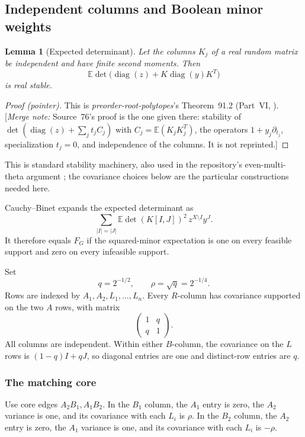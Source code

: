 \documentclass[11pt,a4paper]{article}
\newtheorem{lemma}[theorem]{Lemma}
\theoremstyle{remark}\newtheorem{remark}[theorem]{Remark}
\newcommand{\EE}{\mathbb E}                %
\newcommand{\diag}{\operatorname{diag}}    %
\newcommand{\mnote}[1]{[\textit{Merge note:} #1]}
\newcommand{\prp}{\emph{preorder-root-polytopes}}
\begin{document}
\subsection{Independent columns and Boolean minor weights}
\begin{lemma}[Expected determinant]\label{mrn:w:sb:lem:expected}
Let the columns $K_j$ of a real random matrix be independent and have finite second moments. Then
\[
 \EE\det\big(\diag(z)+K\diag(y)K^T\big)
\]
is real stable.
\end{lemma}
\begin{proof}[Proof (pointer)]
This is \prp's Theorem~91.2 (Part~VI, ). \mnote{Source~76's proof is the one given there: stability of $\det(\diag(z)+\sum_jt_jC_j)$ with $C_j=\EE(K_jK_j^T)$, the operators $1+y_j\partial_{t_j}$, specialization $t_j=0$, and independence of the columns. It is not reprinted.}
\end{proof}
This is standard stability machinery, also used in the repository's even-multi-theta argument \cite{b:PRP}; the covariance choices below are the particular constructions needed here.

Cauchy--Binet expands the expected determinant as
\begin{equation}\label{mrn:w:sb:eq:minors}
 \sum_{|I|=|J|}\EE\det(K[I,J])^2\,z^{X\setminus I}y^J.
\end{equation}
It therefore equals $F_G$ if the squared-minor expectation is one on every feasible support and zero on every infeasible support.

Set
\[
 q=2^{-1/2},\qquad \rho=\sqrt q=2^{-1/4}.
\]
Rows are indexed by $A_1,A_2,L_1,\ldots,L_n$. Every $R$-column has covariance supported on the two $A$ rows, with matrix
\begin{equation}\label{mrn:w:sb:eq:Rcov}
 \begin{pmatrix}1&q\\q&1\end{pmatrix}.
\end{equation}
All columns are independent. Within either $B$-column, the covariance on the $L$ rows is $(1-q)I+qJ$, so diagonal entries are one and distinct-row entries are $q$.

\subsubsection{The matching core}
Use core edges $A_2B_1,A_1B_2$. In the $B_1$ column, the $A_1$ entry is zero, the $A_2$ variance is one, and its covariance with each $L_i$ is $\rho$. In the $B_2$ column, the $A_2$ entry is zero, the $A_1$ variance is one, and its covariance with each $L_i$ is $-\rho$.
\end{document}
